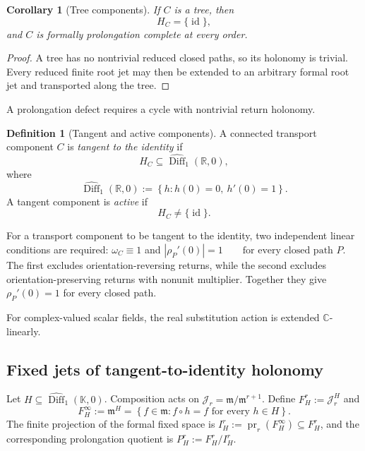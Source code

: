 \documentclass[11pt]{article}
\theoremstyle{plain}
\newtheorem{corollary}[theorem]{Corollary}
\theoremstyle{definition}
\newtheorem{definition}[theorem]{Definition}
\begin{document}
\begin{corollary}[Tree components]
\label{cor:tree-components}
If \(C\) is a tree, then
\[
  H_C=\{\operatorname{id}\},
\]
and \(C\) is formally prolongation complete at every order.
\end{corollary}

\begin{proof}
A tree has no nontrivial reduced closed paths, so its holonomy is
trivial. Every reduced finite root jet may then be extended to an
arbitrary formal root jet and transported along the tree.
\end{proof}

A prolongation defect requires a cycle with nontrivial return holonomy.

\begin{definition}[Tangent and active components]
\label{def:tangent-active-component}
A connected transport component \(C\) is
\emph{tangent to the identity} if
\[
  H_C
  \subseteq
  \widehat{\operatorname{Diff}}_1(\mathbb R,0),
\]
where
\[
  \widehat{\operatorname{Diff}}_1(\mathbb R,0)
  :=
  \left\{
    h:
    h(0)=0,\
    h'(0)=1
  \right\}.
\]
A tangent component is \emph{active} if
\[
  H_C\neq\{\operatorname{id}\}.
\]
\end{definition}

For a transport component to be tangent to the identity, two
independent linear conditions are required: \(\omega_C\equiv1\) and
\(|\rho_P'(0)|=1 \qquad \text{for every closed path }P\).
The first excludes orientation-reversing returns, while the second
excludes orientation-preserving returns with nonunit multiplier.
Together they give \(\rho_P'(0)=1\) for every closed path.

For complex-valued scalar fields, the real substitution action is
extended \(\mathbb C\)-linearly.

\subsection{Fixed jets of tangent-to-identity holonomy}
\label{subsec:fixed-jet-classification}

Let
\(H \subseteq \widehat{\operatorname{Diff}}_1(\mathbb K,0)\).
Composition acts on
\(\mathcal J_r = \mathfrak m/\mathfrak m^{r+1}\).
Define \(F_H^r := \mathcal J_r^H\) and
\[
  F_H^\infty
  :=
  \mathfrak m^H
  =
  \left\{
    f\in\mathfrak m:
    f\circ h=f
    \text{ for every }h\in H
  \right\}.
\]
The finite projection of the formal fixed space is
\(I_H^r := \operatorname{pr}_r \left( F_H^\infty \right) \subseteq F_H^r\),
and the corresponding prolongation quotient is
\(P_H^r := F_H^r/I_H^r\).
\end{document}
